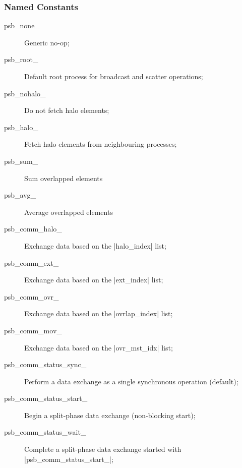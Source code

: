 \subsubsection{Named Constants}
\label{sec:cd_constants}
\begin{description}
\item[psb\_none\_] Generic no-op;
\item[psb\_root\_] Default root process for broadcast and scatter operations;
\item[psb\_nohalo\_]  Do not fetch halo elements;
\item[psb\_halo\_]  Fetch halo elements from neighbouring processes;
\item[psb\_sum\_] Sum overlapped elements
\item[psb\_avg\_] Average overlapped elements
\item[psb\_comm\_halo\_] Exchange data based on the \fortinline|halo_index|
  list;
\item[psb\_comm\_ext\_] Exchange data based on the \fortinline|ext_index|
  list;
\item[psb\_comm\_ovr\_] Exchange data based on the \fortinline|ovrlap_index|
  list;
\item[psb\_comm\_mov\_] Exchange data based on the \fortinline|ovr_mst_idx|
  list;
\item[psb\_comm\_status\_sync\_] Perform a data exchange as a single
  synchronous operation (default);
\item[psb\_comm\_status\_start\_] Begin a split-phase data exchange
  (non-blocking start);
\item[psb\_comm\_status\_wait\_] Complete a split-phase data exchange
  started with \fortinline|psb_comm_status_start_|;

\end{description}


